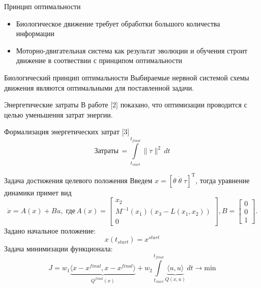 \documentclass[16pt]{beamer}
\begin{document}
    \begin{frame}{Принцип оптимальности}
        \begin{itemize}
            \item Биологическое движение требует обработки большого количества информации
            \item Моторно-двигательная система как результат эволюции и обучения строит движение в соотвествии с принципом оптимальности
        \end{itemize}
        \vfill
        \begin{block}{Биологический принцип оптимальности}
            Выбираемые нервной системой схемы движения являются оптимальными для поставленной задачи.
        \end{block}
    \end{frame}

    \begin{frame}{Энергетические затраты}
        В работе [2] показано, что оптимизации проводится с целью уменьшения затрат энергии.
        \vfill
        \begin{block}{Формализация энергетических затрат [3]}
            $$
                \mbox{Затраты}\, = \int\limits_{t_{start}}^{t_{final}}\|\dot\tau\|^2\,dt
            $$
        \end{block}
    \end{frame}

    \begin{frame}{Задача достижения целевого положения}
        Введем $x = [\theta\;\dot\theta\;\tau]^{\mathrm{T}}$, тогда уравнение динамики примет вид
        $$
            \dot x = A(x) + Bu,\;
            \mbox{где}\,
            A(x) = \left[\begin{aligned}
                x_2 \\
                M^{-1}(x_1)(x_3 - L(x_1, x_2)) \\
                0
            \end{aligned}\right],
            B = \left[\begin{aligned}
                0 \\ 0 \\ 1
            \end{aligned}\right].
        $$
        Задано начальное положение:
        $$
            x(t_{start}) = x^{start}
        $$
        Задача минимизации функционала:
        $$
            J = w_1
            \underbrace{\langle x-x^{final}, x-x^{final} \rangle}_{Q^{final}(x)} + w_2 \int\limits_{t_{start}}^{t_{final}}\underbrace{\langle u, u\rangle}_{Q(x, u)}\,dt \longrightarrow \mathrm{min}
        $$
    \end{frame}
\end{document}
